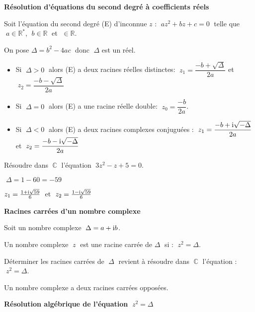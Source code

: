 \textbf{Résolution d'équations du second degré à coefficients réels}
\begin{theorem}
Soit l'équation  du second degré  (E) d'inconnue $ z $ : $ \; a z^2+b z+c=0 \;$ telle que $\; a\in\mathbb{R}^{\ast} $, $\; b\in\mathbb{R} \;$ et $\; \in\mathbb{R} $.

\medskip


On pose $ \Delta  =b^2- 4ac \;$ donc $\; \Delta $ est un réel.
\begin{itemize}
\item  Si  $ \;\Delta > 0 \;$ alors (E) a deux racines réelles distinctes: $ \;z_1=\dfrac{-b+\sqrt{\Delta}}{2a} $ et $\; z_2=\dfrac{-b-\sqrt{\Delta}}{2a} $
\item  Si  $ \;\Delta = 0 \;$ alors (E) a une  racine réelle double: $\; z_0=\dfrac{-b}{2a} $.
\item  Si  $\; \Delta < 0 \;$ alors (E) a deux racines complexes conjuguées : $\; z_1=\dfrac{-b+\text{i}\sqrt{-\Delta}}{2a} \;$ et $ \; z_2=\dfrac{-b-\text{i}\sqrt{-\Delta}}{2a} $
\end{itemize} 
\end{theorem}
\begin{example}
  Résoudre dans  $\; \mathbb{C} \;$  l'équation  $ \; 3z^2-z+5=0 $.

\medskip

  \hspace*{5cm} $\; \Delta = 1-60=-59 $

\medskip

   $ z_1= \frac{1+\text{i}\sqrt{59}}{6}\; $ et $ \;z_2= \frac{1-\text{i}\sqrt{59}}{6} $
   \end{example}
   \textbf{ Racines carrées d'un nombre complexe}
   \begin{definition}
   Soit un nombre complexe $ \;\Delta= a+\text{i} b $.
   
   \medskip
   
   Un nombre complexe $\; z \;$ est une racine carrée de $ \Delta \;$ si : $\; z^2=\Delta $.
   
   \medskip
   
   Déterminer les racines carrées de $\; \Delta \;$ revient à résoudre dans $\; \mathbb{C} \;$ l'équation  : $\; z^2=\Delta $.
    \end{definition}
   \begin{property}
    Un nombre complexe a deux racines carrées opposées.
    \end{property}
    
   \medskip
   \textbf{Résolution algébrique de l'équation } $\; z^2=\Delta $
   
